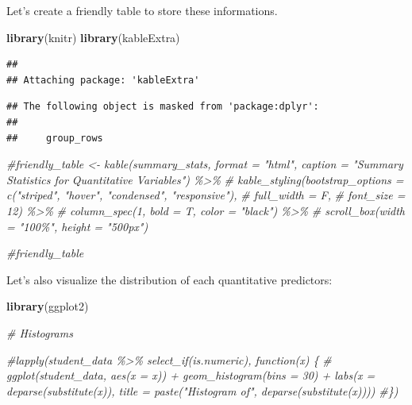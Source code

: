 \documentclass[
]{article}
\newenvironment{Shaded}{\begin{snugshade}}{\end{snugshade}}
\newcommand{\CommentTok}[1]{\textcolor[rgb]{0.56,0.35,0.01}{\textit{#1}}}
\newcommand{\FunctionTok}[1]{\textcolor[rgb]{0.13,0.29,0.53}{\textbf{#1}}}
\newcommand{\NormalTok}[1]{#1}
\begin{document}
Let's create a friendly table to store these informations.

\begin{Shaded}
\begin{Highlighting}[]
\FunctionTok{library}\NormalTok{(knitr)}
\FunctionTok{library}\NormalTok{(kableExtra)}
\end{Highlighting}
\end{Shaded}

\begin{verbatim}
## 
## Attaching package: 'kableExtra'
\end{verbatim}

\begin{verbatim}
## The following object is masked from 'package:dplyr':
## 
##     group_rows
\end{verbatim}

\begin{Shaded}
\begin{Highlighting}[]
\CommentTok{\#friendly\_table \textless{}{-} kable(summary\_stats, format = "html", caption = "Summary Statistics for Quantitative Variables") \%\textgreater{}\%}
\CommentTok{\#  kable\_styling(bootstrap\_options = c("striped", "hover", "condensed", "responsive"), }
\CommentTok{\#                full\_width = F, }
\CommentTok{\#                font\_size = 12) \%\textgreater{}\%}
\CommentTok{\#  column\_spec(1, bold = T, color = "black") \%\textgreater{}\%}
\CommentTok{\#  scroll\_box(width = "100\%", height = "500px")}

\CommentTok{\#friendly\_table}
\end{Highlighting}
\end{Shaded}

Let's also visualize the distribution of each quantitative predictors:

\begin{Shaded}
\begin{Highlighting}[]
\FunctionTok{library}\NormalTok{(ggplot2)}

\CommentTok{\# Histograms}

\CommentTok{\#lapply(student\_data \%\textgreater{}\% select\_if(is.numeric), function(x) \{}
\CommentTok{\#  ggplot(student\_data, aes(x = x)) + geom\_histogram(bins = 30) + labs(x = deparse(substitute(x)), title = paste("Histogram of", deparse(substitute(x))))}
\CommentTok{\#\})}
\end{Highlighting}
\end{Shaded}
\end{document}
